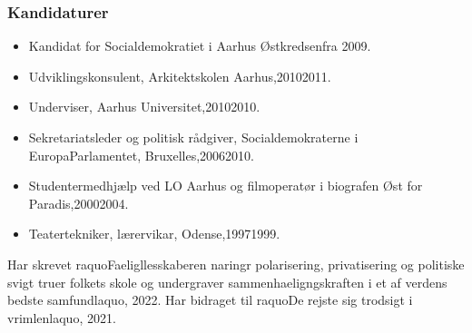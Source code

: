\documentclass[11pt, a4paper]{awesome-cv}
\begin{document}
\begin{cvletter}
\subsubsection*{Kandidaturer}
\begin{itemize}
\item Kandidat for Socialdemokratiet i Aarhus Østkredsenfra 2009.
\end{itemize}
\begin{itemize}
\item Udviklingskonsulent, Arkitektskolen Aarhus,20102011.
\item Underviser, Aarhus Universitet,20102010.
\item Sekretariatsleder og politisk rådgiver, Socialdemokraterne i EuropaParlamentet, Bruxelles,20062010.
\item Studentermedhjælp ved LO Aarhus og filmoperatør i biografen Øst for Paradis,20002004.
\item Teatertekniker, lærervikar, Odense,19971999.
\end{itemize}
Har skrevet raquoFaeligllesskaberen   naringr polarisering, privatisering og politiske svigt truer folkets skole og undergraver sammenhaeligngskraften i et af verdens bedste samfundlaquo, 2022. Har bidraget til raquoDe rejste sig trodsigt i vrimlenlaquo, 2021.

\end{cvletter}
\end{document}
